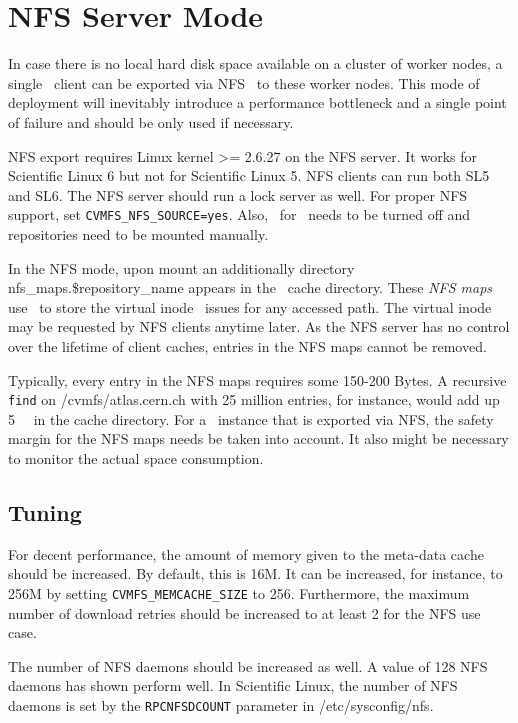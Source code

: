 \section{NFS Server Mode}
In case there is no local hard disk space available on a cluster of worker nodes, a single \cvmfs\ client can be exported via NFS~\cite{rfc1813,rfc3530} to these worker nodes.
This mode of deployment will inevitably introduce a performance bottleneck and a single point of failure and should be only used if necessary.

NFS export requires Linux kernel >= 2.6.27 on the NFS server.
It works for Scientific Linux 6 but not for Scientific Linux 5.
NFS clients can run both SL5 and SL6.
The NFS server should run a lock server as well.
For proper NFS support, set \texttt{CVMFS\_NFS\_SOURCE=yes}. 
Also, \autofs\ for \cvmfs\ needs to be turned off and repositories need to be mounted manually.

In the NFS mode, upon mount an additionally directory nfs\_maps.\$repository\_name appears in the \cvmfs\ cache directory.
These \emph{NFS maps} use \leveldb\ to store the virtual inode \cvmfs\ issues for any accessed path.
The virtual inode may be requested by NFS clients anytime later.
As the NFS server has no control over the lifetime of client caches, entries in the NFS maps cannot be removed.

Typically, every entry in the NFS maps requires some 150-200 Bytes. 
A recursive \texttt{find} on /cvmfs/atlas.cern.ch with 25 million entries, for instance, would add up \SI{5}{\giga\byte} in the cache directory. 
For a \cvmfs\ instance that is exported via NFS, the safety margin for the NFS maps needs be taken into account.
It also might be necessary to monitor the actual space consumption.

\subsection{Tuning}
For decent performance, the amount of memory given to the meta-data cache should be increased. 
By default, this is 16M.
It can be increased, for instance, to 256M by setting \texttt{CVMFS\_MEMCACHE\_SIZE} to 256.
Furthermore, the maximum number of download retries should be increased to at least 2 for the NFS use case.

The number of NFS daemons should be increased as well.
A value of 128 NFS daemons has shown perform well.
In Scientific Linux, the number of NFS daemons is set by the \texttt{RPCNFSDCOUNT} parameter in /etc/sysconfig/nfs.

